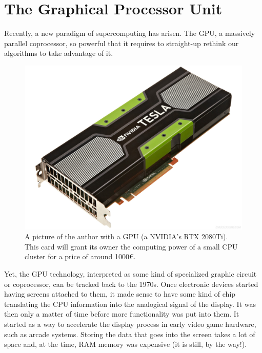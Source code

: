 \documentclass[ twoside,openright,titlepage,numbers=noenddot,%
headinclude,footinclude,cleardoublepage=empty,abstract=on,
BCOR=5mm,paper=a4,fontsize=11pt, dvipsnames
]{scrreprt}
\newcommand{\gpu}{\gls{GPU}\xspace}
\begin{document}
\section{The Graphical Processor Unit}

Recently, a new paradigm of supercomputing has arisen. The \gpu, a massively parallel coprocessor, so powerful that it requires to straight-up rethink our algorithms to take advantage of it.

\begin{figure}
  \centering
  \includegraphics[width=\textwidth]{gpu_and_me}
  \caption{A picture of the author with a GPU (a NVIDIA's RTX 2080Ti). This card will grant its owner the computing power of a small CPU cluster for a price of around 1000€.}
  \label{fig:gpuandme}
\end{figure}

Yet, the \gpu technology, interpreted as some kind of specialized graphic circuit or coprocessor, can be tracked back to the 1970s. Once electronic devices started having screens attached to them, it made sense to have some kind of chip translating the CPU information into the analogical signal of the display. It was then only a matter of time before more functionality was put into them. It started as a way to accelerate the display process in early video game hardware, such as arcade systems.
Storing the data that goes into the screen takes a lot of space and, at the time, RAM memory was expensive (it is still, by the way!).
\end{document}
